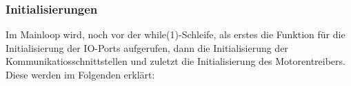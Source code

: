 \begin{tabbing}
%
%
%



\end{tabbing}
\subsubsection{Initialisierungen}\label{subsubsec:Initialisierungen}

Im Mainloop wird, noch vor der while(1)-Schleife, als erstes die Funktion für die Initialisierung der IO-Ports aufgerufen, dann die Initialisierung der Kommunikatiosschnittstellen und zuletzt die Initialisierung des Motorentreibers. Diese werden im Folgenden erklärt:


